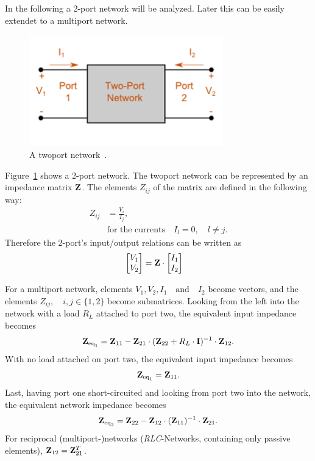 In the following a 2-port network will be analyzed.
Later this can be easily extendet to a multiport network.
\begin{figure}[h]
\begin{center}
\includegraphics[width=0.75\textwidth]{images/twoport.png}
\caption{A twoport network~\cite{magnus:twoport}.}
\label{fig:twoport}
\end{center}
\end{figure}

Figure~\ref{fig:twoport} shows a 2-port network.
The twoport network can be represented by an impedance matrix $\mathbf{Z}$.
The elements $Z_{ij}$ of the matrix are defined in the following way:
\begin{align}
\label{eq:multiport_impedance}
Z_{ij} &= \frac{V_i}{I_j},\\\nonumber
&\text{for the currents}\quad I_l = 0,\quad l\neq j.
\end{align}
Therefore the 2-port's input/output relations can be written as
\begin{align}
\label{eq:twoport_io}
\begin{bmatrix}
V_1\\V_2
\end{bmatrix} &= \mathbf{Z} \cdot
\begin{bmatrix}
I_1\\I_2
\end{bmatrix}
\end{align}

For a multiport network, elements $V_1,V_2,I_1\quad\text{and}\quad I_2$ become vectors, and the elements $Z_{ij},\quad i,j\in\{1,2\}$ become submatrices.
Looking from the left into the network with a load $R_L$ attached to port two, the equivalent input impedance becomes
\begin{equation}
\label{eq:eq_imp_load}
\mathbf{Z}_{\text{eq}_1} = \mathbf{Z}_{11} - \mathbf{Z}_{21}\cdot(\mathbf{Z}_{22} + R_L\cdot\mathbf{I})^{-1}\cdot \mathbf{Z}_{12}.
\end{equation}
With no load attached on port two, the equivalent input impedance becomes
\begin{equation}
\label{eq:eq_imp_oc}
\mathbf{Z}_{\text{eq}_1} = \mathbf{Z}_{11}.
\end{equation}
Last, having port one short-circuited and looking from port two into the network, the equivalent network impedance becomes
\begin{equation}
\label{eq:eq_imp_sc}
\mathbf{Z}_{\text{eq}_2} = \mathbf{Z}_{22} - \mathbf{Z}_{12}\cdot(\mathbf{Z}_{11})^{-1}\cdot \mathbf{Z}_{21}.
\end{equation}
For reciprocal (multiport-)networks (\textit{RLC}-Networks, containing only passive elements), $\mathbf{Z}_{12} = \mathbf{Z}_{21}^T$.

